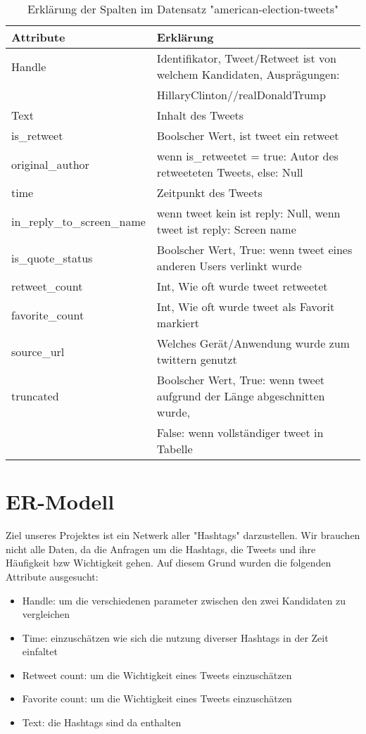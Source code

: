 \documentclass[a4paper]{article}
\begin{document}
\begin{table}[htbp]
\centering
\begin{tabular}{l|l}
Attribute & Erklärung \\\hline
Handle & Identifikator, Tweet/Retweet ist von welchem Kandidaten, Ausprägungen:\\ 
 & HillaryClinton//realDonaldTrump\\
Text & Inhalt des Tweets \\
is\_retweet & Boolscher Wert, ist tweet ein retweet \\
original\_author & wenn is\_retweetet = true: Autor des retweeteten Tweets, else: Null \\
time & Zeitpunkt des Tweets \\
in\_reply\_to\_screen\_name & wenn tweet kein ist reply: Null, wenn tweet ist reply: Screen name \\
is\_quote\_status & Boolscher Wert, True: wenn tweet eines anderen Users verlinkt wurde \\
retweet\_count & Int, Wie oft wurde tweet retweetet \\
favorite\_count & Int, Wie oft wurde tweet als Favorit markiert \\
source\_url & Welches Gerät/Anwendung wurde zum twittern genutzt \\
truncated & Boolscher Wert, True: wenn tweet aufgrund der Länge abgeschnitten wurde,\\
 & False: wenn vollständiger tweet in Tabelle\\

\end{tabular}
\caption{\label{tab:widgets}Erklärung der Spalten im Datensatz "american-election-tweets"}
\end{table}

\section{ER-Modell}

Ziel unseres Projektes ist ein Netwerk aller "Hashtags" darzustellen. Wir brauchen nicht alle Daten, da die Anfragen um die Hashtags, die Tweets und ihre Häufigkeit bzw Wichtigkeit gehen.
Auf diesem Grund wurden die folgenden Attribute ausgesucht:

\begin{itemize}
\item Handle: um die verschiedenen parameter zwischen den zwei Kandidaten zu vergleichen
\item Time: einzuschätzen wie sich die nutzung diverser Hashtags in der Zeit einfaltet
\item Retweet count: um die Wichtigkeit eines Tweets einzuschätzen
\item Favorite count: um die Wichtigkeit eines Tweets einzuschätzen
\item Text: die Hashtags sind da enthalten
\end{itemize}
\end{document}
